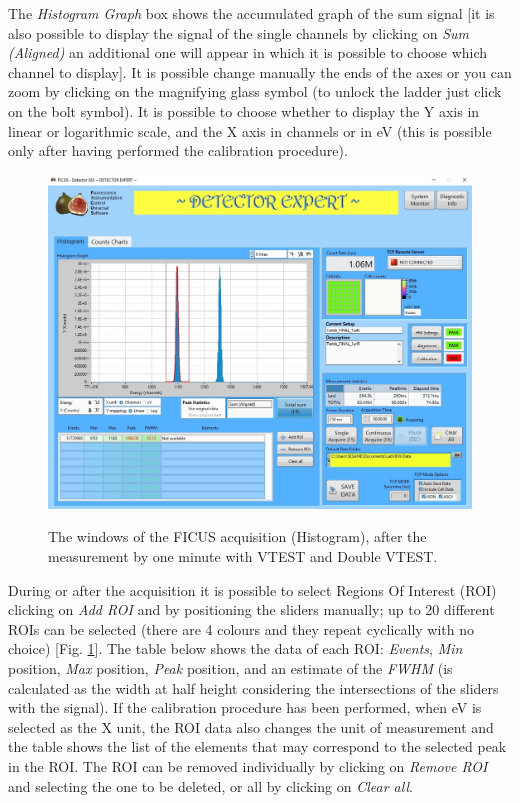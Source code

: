 \documentclass[a4paper,12pt,oneside,pdflatex,italian,final,twocolumn]{article}
\begin{document}
The \textit{Histogram Graph} box shows the accumulated graph of the sum signal [it is also possible to display the signal of the single channels by clicking on \textit{Sum (Aligned)} an additional one will appear in which it is possible to choose which channel to display]. It is possible change manually the ends of the axes or you can zoom by clicking on the magnifying glass symbol (to unlock the ladder just click on the bolt symbol).
It is possible to choose whether to display the Y axis in linear or logarithmic scale, and the X axis in channels or in eV (this is possible only after having performed the calibration procedure).

\begin{figure}[h!]
\centering
{\includegraphics[width=.95\textwidth]{Capture31.jpg}} \quad
\caption{The windows of the FICUS acquisition (Histogram), after the measurement by one minute with VTEST and Double VTEST.}\label{fig:fig24}
\end{figure}

During or after the acquisition it is possible to select Regions Of Interest (ROI) clicking on \textit{Add ROI} and by positioning the sliders manually; up to 20 different ROIs can be selected (there are 4 colours and they repeat cyclically with no choice) [Fig. \ref{fig:fig24}]. 
The table below shows the data of each ROI: \textit{Events}, \textit{Min} position, \textit{Max} position, \textit{Peak} position, and an estimate of the \textit{FWHM} (is calculated as the width at half height considering the intersections of the sliders with the signal). 
If the calibration procedure has been performed, when eV is selected as the X unit, the ROI data also changes the unit of measurement and the table shows the list of the elements that may correspond to the selected peak in the ROI.
The ROI can be removed individually by clicking on \textit{Remove ROI} and selecting the one to be deleted, or all by clicking on \textit{Clear all}.
\end{document}

